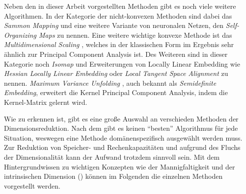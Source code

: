 Neben den in dieser Arbeit vorgestellten Methoden gibt es noch viele weitere Algorithmen. In der
Kategorie der nicht-konvexen Methoden sind dabei das \textit{Sammon Mapping} \parencite{Sammon.1969} und eine weitere Variante von neuronalen Netzen, den \textit{Self-Organizing
	Maps} \parencite{Kohonen.1990} zu nennen. Eine weitere wichtige konvexe Methode ist das
\textit{Multidimensional Scaling} \parencites{Kruskal.1964}{Cox.2008}, welches in der klassischen Form im Ergebnis sehr ähnlich zur
Principal Component Analysis ist. Des Weiteren sind in dieser Kategorie noch \textit{Isomap} \parencite{Tenenbaum.2000} und Erweiterungen von Locally Linear Embedding wie \textit{Hessian Locally
	Linear Embedding} \parencite{Donoho.2003} oder \textit{Local Tangent Space Alignment} \parencite{Zhang.2002} zu nennen. \textit{Maximum Variance Unfolding} \parencite{Weinberger.2006}, auch bekannt als \textit{Semidefinite Embedding}, erweitert die Kernel
Principal Component Analysis, indem die Kernel-Matrix gelernt wird.

Wie zu erkennen ist, gibt es eine große Auswahl an verschieden Methoden der Dimensionsreduktion.
Nach dem  \parencite{Wolpert.1997} gibt es keinen \enquote{besten} Algorithmus für jede Situation, weswegen eine
Methode domänenspezifisch ausgewählt werden muss. Zur Reduktion von Speicher- und Rechenkapazitäten
und aufgrund des Fluchs der Dimensionalität kann der Aufwand trotzdem sinnvoll sein. Mit dem
Hintergrundwissen zu wichtigen Konzepten wie der Mannigfaltigkeit und der intrinsischen Dimension
() können im Folgenden die einzelnen
Methoden vorgestellt werden.